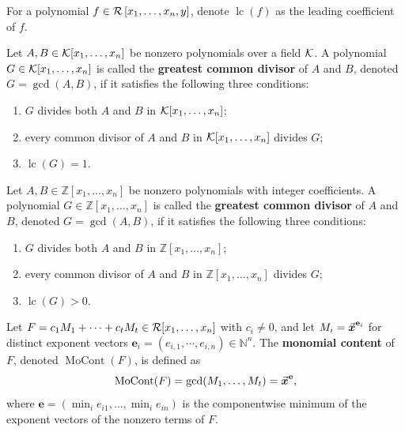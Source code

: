 \documentclass{article}
\numberwithin{equation}{section}
\begin{document}
For a polynomial $f\in {\mathcal{R}}\left[x_1,\dots,x_n,y \right]$, denote ${\operatorname{lc}}(f)$ as the leading coefficient of $f$.   


\begin{definition}
Let $A, B \in {\mathcal{K}}[x_1,\dots,x_n]$ be nonzero polynomials over a field ${\mathcal{K}}$. A polynomial $G \in {\mathcal{K}}[x_1,\dots,x_n]$ is called the \textbf{greatest common divisor} of $A$ and $B$, denoted $G = \gcd(A,B)$, if it satisfies the following three conditions:

\begin{enumerate}
    \item $G$ divides both $A$ and $B$ in ${\mathcal{K}}[x_1,\dots,x_n]$;
    \item every common divisor of $A$ and $B$ in ${\mathcal{K}}[x_1,\dots,x_n]$ divides $G$;
    \item $\operatorname{lc}(G) = 1$.
\end{enumerate}
\end{definition}
    

\begin{definition}
Let $A, B \in \mathbb{Z}[x_1,\dots,x_n]$ be nonzero polynomials with integer coefficients. A polynomial $G \in \mathbb{Z}[x_1,\dots,x_n]$ is called the \textbf{greatest common divisor} of $A$ and $B$, denoted $G = \gcd(A,B)$, if it satisfies the following three conditions:

\begin{enumerate}
    \item $G$ divides both $A$ and $B$ in $\mathbb{Z}[x_1,\dots,x_n]$;
    \item every common divisor of $A$ and $B$ in $\mathbb{Z}[x_1,\dots,x_n]$ divides $G$;
    \item $\operatorname{lc}(G)>0$.
\end{enumerate}
\end{definition}

\begin{definition}\label{def-monocont}
Let $F = c_1 M_1 + \cdots + c_t M_t \in {\mathcal{R}}[x_1,\dots,x_n]$ with $c_i \neq 0$, and let $M_i = \vec{\boldsymbol{x}}^{\mathbf{e}_i}$ for distinct exponent vectors $\mathbf{e}_i=(e_{i,1},\cdots,e_{i,n}) \in \mathbb{N}^n$. The \textbf{monomial content} of $F$, denoted $\operatorname{MoCont}(F)$, is defined as
\[
\operatorname{MoCont}(F) = \gcd(M_1,\dots,M_t)=\vec{\boldsymbol{x}}^{\mathbf{e}},
\]
where $\mathbf{e} = (\min_i e_{i1}, \dots, \min_i e_{in})$ is the componentwise minimum of the exponent vectors of the nonzero terms of $F$.
\end{definition}
\end{document}
